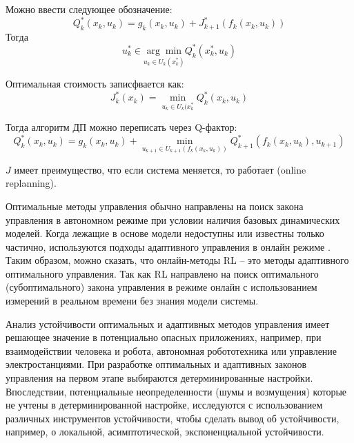 Можно ввести следующее обозначение:
\begin{equation*}
	Q^*_k(x_k, u_k)= g_k(x_k, u_k) + J^*_{k+1}(f_k(x_k, u_k))
\end{equation*}
Тогда
\begin{equation*}
	u_k^* \in \underset{u_k \in U_k(x_k^*)}{\arg \min}Q^*_k(x_k^*, u_k)
\end{equation*}

Оптимальная стоимость записфвается как:
\begin{equation*}
	J_k^*(x_k) = \underset{u_k \in U_k(x_k^*}{\min}Q^*_k(x_k, u_k)
\end{equation*}

Тогда алгоритм ДП можно переписать через Q-фактор:
\begin{equation*}
	Q_k^*(x_k, u_k) = g_k(x_k, u_k) + \underset{u_{k+1} \in U_{k+1}(f_k(x_k, u_k))}{\min}Q^*_{k+1}(f_k(x_k, u_k), u_{k+1})
\end{equation*}

$J$ имеет преимущество, что если система меняется, то работает (online replanning).





Оптимальные методы управления обычно направлены на поиск закона управления в автономном режиме при условии наличия базовых динамических моделей. Когда лежащие в основе модели недоступны или известны только частично, используются подходы адаптивного управления в онлайн режиме \cite{landau2011adaptive}. Таким образом, можно сказать, что онлайн-методы RL -- это методы адаптивного оптимального управления. Так как RL направлено на поиск оптимального (субоптимального) закона управления в режиме онлайн с использованием измерений в реальном времени без знания модели системы.

Анализ устойчивости оптимальных и адаптивных методов управления имеет решающее значение в потенциально опасных приложениях, например, при взаимодействии человека и робота, автономная робототехника или управление электростанциями. При разработке оптимальных и адаптивных законов управления на первом этапе выбираются детерминированные настройки.
Впоследствии, потенциальные неопределенности (шумы и возмущения) которые не учтены в детерминированной настройке, исследуются с использованием различных инструментов устойчивости, чтобы сделать вывод об устойчивости, например, о локальной, асимптотической, экспоненциальной устойчивости.

